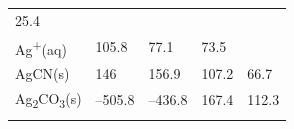 \documentclass[
]{book}
\theoremstyle{definition}
\theoremstyle{definition}
\theoremstyle{definition}
\theoremstyle{remark}
\begin{document}
\begin{longtable}[]{@{}lllll@{}}
\begin{minipage}[t]{0.18\columnwidth}
25.4\strut
\end{minipage}\tabularnewline
\begin{minipage}[t]{0.10\columnwidth}\raggedright
Ag\textsuperscript{+}(aq)\strut
\end{minipage} & \begin{minipage}[t]{0.19\columnwidth}\raggedright
105.8\strut
\end{minipage} & \begin{minipage}[t]{0.20\columnwidth}\raggedright
77.1\strut
\end{minipage} & \begin{minipage}[t]{0.18\columnwidth}\raggedright
73.5\strut
\end{minipage} & \begin{minipage}[t]{0.18\columnwidth}\raggedright
\strut
\end{minipage}\tabularnewline
\begin{minipage}[t]{0.10\columnwidth}\raggedright
AgCN(s)\strut
\end{minipage} & \begin{minipage}[t]{0.19\columnwidth}\raggedright
146\strut
\end{minipage} & \begin{minipage}[t]{0.20\columnwidth}\raggedright
156.9\strut
\end{minipage} & \begin{minipage}[t]{0.18\columnwidth}\raggedright
107.2\strut
\end{minipage} & \begin{minipage}[t]{0.18\columnwidth}\raggedright
66.7\strut
\end{minipage}\tabularnewline
\begin{minipage}[t]{0.10\columnwidth}\raggedright
Ag\textsubscript{2}CO\textsubscript{3}(s)\strut
\end{minipage} & \begin{minipage}[t]{0.19\columnwidth}\raggedright
--505.8\strut
\end{minipage} & \begin{minipage}[t]{0.20\columnwidth}\raggedright
--436.8\strut
\end{minipage} & \begin{minipage}[t]{0.18\columnwidth}\raggedright
167.4\strut
\end{minipage} & \begin{minipage}[t]{0.18\columnwidth}\raggedright
112.3\strut
\end{minipage}\tabularnewline
\begin{minipage}[t]{0.10\columnwidth}\raggedright

\end{minipage}
\end{longtable}
\end{document}
